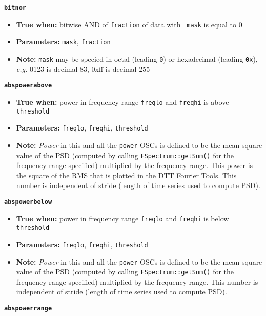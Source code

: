 \documentclass[11pt]{article}
\begin{document}
{\large\texttt{\textbf{bitnor}}}

\begin{itemize}
\item \textbf{True when:} bitwise AND of \texttt{fraction} of data with \texttt{
    mask} is equal to 0
\item \textbf{Parameters:} \texttt{mask}, \texttt{fraction}
\item \textbf{Note:} \texttt{mask} may be specied in octal (leading
  \texttt{0}) or hexadecimal (leading \texttt{0x}),
  \textit{e.g.} 0123 is decimal 83, 0xff is decimal 255  
\end{itemize}


{\large\texttt{\textbf{abspowerabove}}}

\begin{itemize}
\item \textbf{True when:}  power in frequency range \texttt{freqlo}
  and \texttt{freqhi} is above \texttt{threshold}

\item \textbf{Parameters:} \texttt{freqlo}, \texttt{freqhi}, \texttt{threshold}
\item \textbf{Note:} \textit{Power} in this and all the \texttt{power}
  OSCs is defined to be the mean square value of the PSD
  (computed by calling \texttt{FSpectrum::getSum()} for the
  frequency range specified) multiplied by the frequency range.  This
  power is the square of the RMS that is plotted in the DTT Fourier
  Tools. This number is independent of stride (length of time series
  used to compute PSD). 
\end{itemize}


{\large\texttt{\textbf{abspowerbelow}}}

\begin{itemize}
\item \textbf{True when:} power in frequency range \texttt{freqlo}
  and \texttt{freqhi} is below \texttt{threshold}
\item \textbf{Parameters:} \texttt{freqlo}, \texttt{freqhi},
  \texttt{threshold}
\item \textbf{Note:} \textit{Power} in this and all the \texttt{power}
  OSCs is defined to be the mean square value of the PSD
  (computed by calling \texttt{FSpectrum::getSum()} for the
  frequency range specified) multiplied by the frequency range.  
  This number is independent of stride (length of time series used to
  compute PSD). 
\end{itemize}


{\large\texttt{\textbf{abspowerrange}}}
\end{document}

